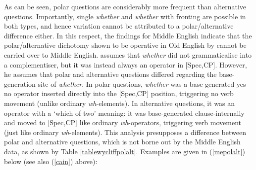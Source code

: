 As can be seen, polar questions are considerably more frequent than alternative questions. Importantly, single \textit{whether} and \textit{whether} with fronting are possible in both types, and hence variation cannot be attributed to a polar/alternative difference either. In this respect, the findings for Middle English indicate that the polar/alternative dichotomy shown to be operative in Old English by \citet[149--150]{walkden2014} cannot be carried over to Middle English. \citet[149--150]{walkden2014} assumes that \textit{whether} did not grammaticalise into a complementiser, but it was instead always an operator in [Spec,CP]. However, he assumes that polar and alternative questions differed regarding the base-generation site of \textit{whether}. In polar questions, \textit{whether} was a base-generated yes-no operator inserted directly into the [Spec,CP] position, triggering no verb movement (unlike ordinary \textit{wh}-elements). In alternative questions, it was an operator with a `which of two' meaning: it was base-generated clause-internally and moved to [Spec,CP] like ordinary \textit{wh}-operators, triggering verb movement (just like ordinary \textit{wh}-elements). This analysis presupposes a difference between polar and alternative questions, which is not borne out by the Middle English data, as shown by Table \ref{tablewycliffpolalt}. Examples are given in (\ref{mepolalt}) below (see also (\ref{cain}) above):\largerpage

